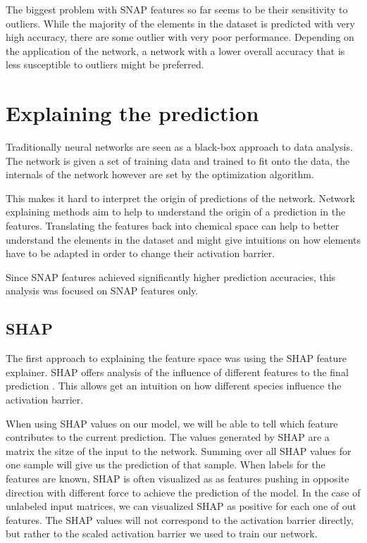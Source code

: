 The biggest problem with SNAP features so far seems to be their sensitivity to outliers.
While the majority of the elements in the dataset is predicted with very high accuracy, 
there are some outlier with very poor performance.
Depending on the application of the network, a network with a lower overall accuracy 
that is less susceptible to outliers might be preferred.


\section{Explaining the prediction}

Traditionally neural networks are seen as a black-box approach to data analysis.
The network is given a set of training data and trained to fit onto the data,
the internals of the network however are set by the optimization algorithm.

This makes it hard to interpret the origin of predictions of the network.
Network explaining methods aim to help to understand the origin of a prediction in the features.
Translating the features back into chemical space can help to better understand 
the elements in the dataset and might give intuitions on how elements have to be adapted in order to change their activation barrier.

Since SNAP features achieved significantly higher prediction accuracies,
this analysis was focused on SNAP features only.

\subsection{SHAP}

The first approach to explaining the feature space was using the SHAP feature explainer.
SHAP offers analysis of the influence of different features to the final prediction \cite{NIPS2017_7062}.
This allows get an intuition on how different species influence the activation barrier.

When using SHAP values on our model, we will be able to tell which feature contributes to the current prediction.
The values generated by SHAP are a matrix the sitze of the input to the network.
Summing over all SHAP values for one sample will give us the prediction of that sample.
When labels for the features are  known, SHAP is often visualized as as features pushing in opposite direction with different force 
to achieve the prediction of the model.
In the case of unlabeled input matrices, we can visualized SHAP as positive for each one of out features.
The SHAP values will not correspond to the activation barrier directly,
but rather to the scaled activation barrier we used to train our network.

